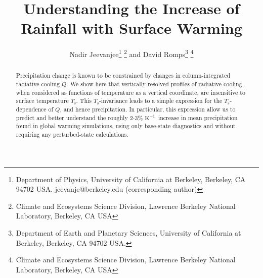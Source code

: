 \documentclass[10pt]{article}
\newcommand{\Ts}{\ensuremath{T_\mathrm{s}}}
\newcommand{\Kinverse}{\ensuremath{\mathrm{K^{-1}}}}
\begin{document}
%
%


\title{Understanding the Increase of Rainfall with Surface Warming}

%
%


 \author{Nadir Jeevanjee\footnote{Department of Physics, University of California at Berkeley, Berkeley, CA 94702  USA. jeevanje@berkeley.edu (corresponding author)} \footnote{Climate and Ecosystems Science Division, Lawrence Berkeley National Laboratory, Berkeley, CA USA} and David Romps\footnote{Department of Earth and Planetary Sciences, University of California at Berkeley, Berkeley, CA 94702  USA.} \footnote{Climate and Ecosystems Science Division, Lawrence Berkeley National Laboratory, Berkeley, CA USA}
}

\maketitle

\begin{abstract}
Precipitation change is known to be constrained by changes in column-integrated radiative cooling $Q$. We show here that vertically-resolved profiles of radiative cooling, when considered as functions of temperature as a vertical coordinate, are insensitive to surface temperature \Ts. This \Ts-invariance leads to a simple expression for the \Ts-dependence of $Q$, and hence precipitation. In particular, this expression allow us to predict and better understand the roughly 2-3\% \Kinverse\ increase in mean precipitation  found in global warming simulations, using only base-state diagnostics and without requiring any perturbed-state calculations.

%
%
\end{abstract}


%
%
\end{document}
